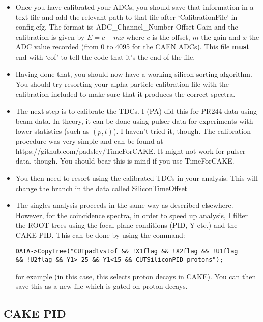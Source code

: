 \documentclass[11pt]{report}
\begin{document}
\begin{itemize}
\item Once you have calibrated your ADCs, you should save that information in a text file and add the relevant path to that file after ‘CalibrationFile’ in config.cfg. The format is: ADC\_Channel\_Number Offset Gain and the calibration is given by $E = c + mx$ where $c$ is the offset, $m$ the gain and $x$ the ADC value recorded (from 0 to 4095 for the CAEN ADCs). This file \textbf{must} end with `eof' to tell the code that it's the end of the file.

\item Having done that, you should now have a working silicon sorting algorithm. You should try resorting your alpha-particle calibration file with the calibration included to make sure that it produces the correct spectra.

\item The next step is to calibrate the TDCs. I (PA) did this for PR244 data using beam data. In theory, it can be done using pulser data for experiments with lower statistics (such as $(p,t)$). I haven't tried it, though. The calibration procedure was very simple and can be found at https://github.com/padsley/TimeForCAKE. It might not work for pulser data, though. You should bear this is mind if you use TimeForCAKE.

\item You then need to resort using the calibrated TDCs in your analysis. This will change the branch in the data called SiliconTimeOffset

\item The singles analysis proceeds in the same way as described elsewhere. However, for the coincidence spectra, in order to speed up analysis, I filter the ROOT trees using the focal plane conditions (PID, Y etc.) and the CAKE PID. This can be done by using the command:

\begin{verbatim}
DATA->CopyTree("CUTpad1vstof && !X1flag && !X2flag && !U1flag
&& !U2flag && Y1>-25 && Y1<15 && CUTSiliconPID_protons");
\end{verbatim}

\noindent for example (in this case, this selects proton decays in CAKE). You can then save this as a new file which is gated on proton decays.


\end{itemize}



\subsection{CAKE PID}
\end{document}
